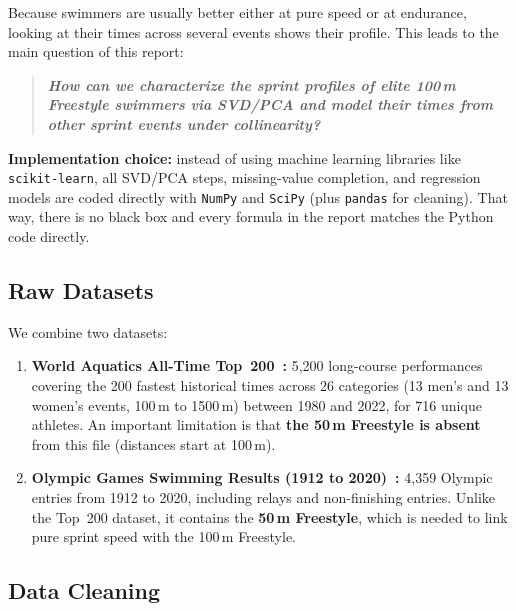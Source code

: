 \documentclass[11pt, a4paper]{article}
\begin{document}
\noindent Because swimmers are usually better either at pure speed or at endurance, looking at their times across several events shows their profile. This leads to the main question of this report:
\begin{quote}
    \textbf{\textit{How can we characterize the sprint profiles of elite 100\,m Freestyle swimmers via SVD/PCA and model their times from other sprint events under collinearity?}}
\end{quote}

\noindent \textbf{Implementation choice:} instead of using machine learning libraries like \texttt{scikit-learn}, all SVD/PCA steps, missing-value completion, and regression models are coded directly with \texttt{NumPy} and \texttt{SciPy} (plus \texttt{pandas} for cleaning). That way, there is no black box and every formula in the report matches the Python code directly.

\subsection{Raw Datasets}

We combine two datasets:
\begin{enumerate}
    \item \textbf{World Aquatics All-Time Top~200~\cite{kaggle_top200}:} 5{,}200 long-course performances covering the 200 fastest historical times across 26 categories (13 men's and 13 women's events, 100\,m to 1500\,m) between 1980 and 2022, for 716 unique athletes. An important limitation is that \textbf{the 50\,m Freestyle is absent} from this file (distances start at 100\,m).

    \item \textbf{Olympic Games Swimming Results (1912 to 2020)~\cite{kaggle_olympics}:} 4{,}359 Olympic entries from 1912 to 2020, including relays and non-finishing entries. Unlike the Top~200 dataset, it contains the \textbf{50\,m Freestyle}, which is needed to link pure sprint speed with the 100\,m Freestyle.
\end{enumerate}

\subsection{Data Cleaning}
\end{document}
